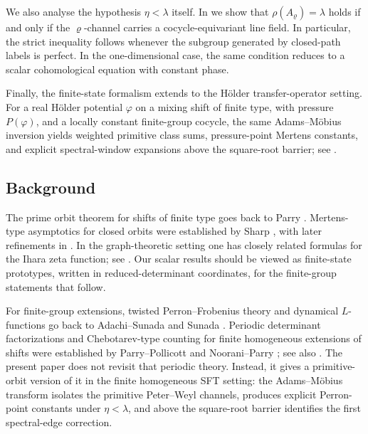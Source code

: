 We also analyse the hypothesis \(\eta<\lambda\) itself. In
 we show that \(\rho(A_\varrho)=\lambda\) holds if
and only if the \(\varrho\)-channel carries a cocycle-equivariant line
field. In particular, the strict inequality follows whenever the
subgroup generated by closed-path labels is perfect. In the
one-dimensional case, the same condition reduces to a scalar
cohomological equation with constant phase.

Finally, the finite-state formalism extends to the H\"older
transfer-operator setting. For a real H\"older potential \(\varphi\) on
a mixing shift of finite type, with pressure \(P(\varphi)\), and a
locally constant finite-group cocycle, the same Adams--M\"obius
inversion yields weighted primitive class sums, pressure-point Mertens
constants, and explicit spectral-window expansions above the square-root
barrier; see
.

\subsection{Background}

The prime orbit theorem for shifts of finite type goes back to Parry
\cite{Parry1983PrimeOrbit}. Mertens-type asymptotics for closed orbits
were established by Sharp \cite{Sharp1991Mertens}, with later
refinements in
\cite{Sharp1993PrimeOrbitAnnals,PollicottSharp1998Mertens}. In the
graph-theoretic setting one has closely related formulas for the Ihara
zeta function; see
\cite{StarkTerras1996ZetaGraphCoverings,StarkTerras2000ZetaGraphCoveringsII,%
TerrasStark2007ZetaGraphCoveringsIII,HasegawaSaito2016GraphMertens,%
HasegawaSaitoSato2015AbelianCovering,HasegawaSaitoSato2018GaloisCovering}.
Our scalar results should be viewed as finite-state prototypes, written
in reduced-determinant coordinates, for the finite-group statements that
follow.

For finite-group extensions, twisted Perron--Frobenius theory and
dynamical \(L\)-functions go back to Adachi--Sunada
\cite{AdachiSunada1987TwistedPerronFrobenius} and Sunada
\cite{Sunada1989DynamicalLFunctions}. Periodic determinant
factorizations and Chebotarev-type counting for finite homogeneous
extensions of shifts were established by Parry--Pollicott
\cite{ParryPollicott1986Chebotarev} and Noorani--Parry
\cite{NooraniParry1992ChebotarevShifts}; see also
\cite{PollicottSharp2007Chebotarev,Parry1999LivsicNonAbelian,%
BoyleSchmieding2017FiniteGroupExtensions}. The present paper does not
revisit that periodic theory. Instead, it gives a primitive-orbit
version of it in the finite homogeneous SFT setting: the
Adams--M\"obius transform isolates the primitive Peter--Weyl channels,
produces explicit Perron-point constants under \(\eta<\lambda\), and
above the square-root barrier identifies the first spectral-edge
correction.

